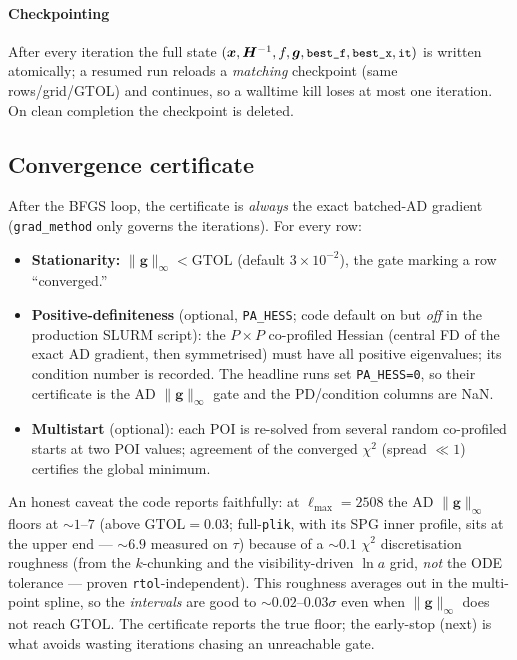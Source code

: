 \documentclass[11pt]{article}
\newcommand{\code}[1]{\texttt{\small #1}}
\newcommand{\chisq}{\chi^2}
\newcommand{\ginf}{\lVert \bm{g}\rVert_\infty}
\newcommand{\Lmax}{\ell_{\max}}
\begin{document}
\paragraph{Checkpointing}
After every iteration the full state
$(\bm x,\bm H^{-1},f,\bm g,\code{best\_f},\code{best\_x},\code{it})$ is
written atomically; a resumed run reloads a \emph{matching} checkpoint
(same rows/grid/GTOL) and continues, so a walltime kill loses at most one
iteration. On clean completion the checkpoint is deleted.

\subsection{Convergence certificate}
\label{sec:cert}

After the BFGS loop, the certificate is \emph{always} the exact batched-AD
gradient (\code{grad\_method} only governs the iterations). For every row:
\begin{itemize}[leftmargin=1.5em,itemsep=1pt]
\item \textbf{Stationarity:} $\ginf<\mathrm{GTOL}$ (default
$3\times10^{-2}$), the gate marking a row ``converged.''
\item \textbf{Positive-definiteness} (optional, \code{PA\_HESS}; code
default on but \emph{off} in the production SLURM script): the $P\times P$
co-profiled Hessian (central FD of the exact AD gradient, then
symmetrised) must have all positive eigenvalues; its condition number is
recorded. The headline runs set \code{PA\_HESS=0}, so their certificate is
the AD $\ginf$ gate and the PD/condition columns are NaN.
\item \textbf{Multistart} (optional): each POI is re-solved from several
random co-profiled starts at two POI values; agreement of the converged
$\chisq$ (spread $\ll1$) certifies the global minimum.
\end{itemize}
An honest caveat the code reports faithfully: at $\Lmax=2508$ the AD
$\ginf$ floors at $\sim1$--$7$ (above $\mathrm{GTOL}=0.03$; full-\code{plik},
with its SPG inner profile, sits at the upper end --- $\sim6.9$ measured on
$\tau$) because of a
$\sim0.1$ $\chisq$ discretisation roughness (from the $k$-chunking and the
visibility-driven $\ln a$ grid, \emph{not} the ODE tolerance --- proven
\code{rtol}-independent). This roughness averages out in the multi-point
spline, so the \emph{intervals} are good to $\sim0.02$--$0.03\sigma$ even
when $\ginf$ does not reach GTOL. The certificate reports the true floor;
the early-stop (next) is what avoids wasting iterations chasing an
unreachable gate.
\end{document}
